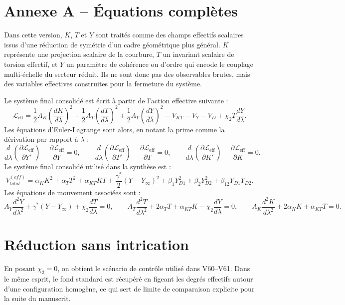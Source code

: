 \section{Annexe A -- Équations complètes}
Dans cette version, $K$, $T$ et $Y$ sont traités comme des champs effectifs scalaires issus d'une réduction de symétrie d'un cadre géométrique plus général. $K$ représente une projection scalaire de la courbure, $T$ un invariant scalaire de torsion effectif, et $Y$ un paramètre de cohérence ou d'ordre qui encode le couplage multi-échelle du secteur réduit. Ils ne sont donc pas des observables brutes, mais des variables effectives construites pour la fermeture du système.

Le système final consolidé est écrit à partir de l'action effective suivante :
\[
\mathcal{L}_{\mathrm{eff}}=\frac12 A_K\left(\frac{dK}{d\lambda}\right)^2+\frac12 A_T\left(\frac{dT}{d\lambda}\right)^2+\frac12 A_Y\left(\frac{dY}{d\lambda}\right)^2 - V_{KT}-V_Y-V_D + \chi_2 T\frac{dY}{d\lambda}.
\]
Les équations d'Euler-Lagrange sont alors, en notant la prime comme la dérivation par rapport à $\lambda$ :
\[
\frac{d}{d\lambda}\left(\frac{\partial \mathcal{L}_{\mathrm{eff}}}{\partial Y'}\right)-\frac{\partial \mathcal{L}_{\mathrm{eff}}}{\partial Y}=0,
\qquad
\frac{d}{d\lambda}\left(\frac{\partial \mathcal{L}_{\mathrm{eff}}}{\partial T'}\right)-\frac{\partial \mathcal{L}_{\mathrm{eff}}}{\partial T}=0,
\qquad
\frac{d}{d\lambda}\left(\frac{\partial \mathcal{L}_{\mathrm{eff}}}{\partial K'}\right)-\frac{\partial \mathcal{L}_{\mathrm{eff}}}{\partial K}=0.
\]
Le système final consolidé utilisé dans la synthèse est :
\[
V_{total}^{(eff)}=\alpha_KK^2+\alpha_TT^2+\alpha_{KT}KT+\frac{\gamma^*}{2}(Y-Y_\infty)^2+\beta_1Y_{D1}^2+\beta_2Y_{D2}^2+\beta_{12}Y_{D1}Y_{D2}.
\]
Les équations de mouvement associées sont :
\[
 A_Y\frac{d^2Y}{d\lambda^2}+\gamma^*(Y-Y_\infty)+\chi_2\frac{dT}{d\lambda}=0,
\qquad
 A_T\frac{d^2T}{d\lambda^2}+2\alpha_TT+\alpha_{KT}K-\chi_2\frac{dY}{d\lambda}=0,
\qquad
 A_K\frac{d^2K}{d\lambda^2}+2\alpha_KK+\alpha_{KT}T=0.
\]

\section{Réduction sans intrication}
En posant $\chi_2=0$, on obtient le scénario de contrôle utilisé dans V60--V61.
Dans le même esprit, le fond standard est récupéré en figeant les degrés effectifs autour d'une configuration homogène, ce qui sert de limite de comparaison explicite pour la suite du manuscrit.